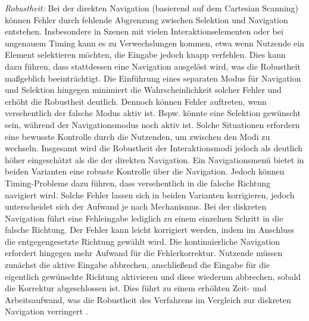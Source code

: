 \textit{Robustheit:}
Bei der direkten Navigation (basierend auf dem Cartesian Scanning) können Fehler durch fehlende Abgrenzung zwischen Selektion und Navigation entstehen. Insbesondere in Szenen mit vielen Interaktionselementen oder bei ungenauem Timing kann es zu Verwechslungen kommen, etwa wenn Nutzende ein Element selektieren möchten, die Eingabe jedoch knapp verfehlen. Dies kann dazu führen, dass stattdessen eine Navigation ausgelöst wird, was die Robustheit maßgeblich beeinträchtigt. Die Einführung eines separaten Modus für Navigation und Selektion hingegen minimiert die Wahrscheinlichkeit solcher Fehler und erhöht die Robustheit deutlich. Dennoch können Fehler auftreten, wenn versehentlich der falsche Modus aktiv ist. Bspw. könnte eine Selektion gewünscht sein, während der Navigationsmodus noch aktiv ist. Solche Situationen erfordern eine bewusste Kontrolle durch die Nutzenden, um zwischen den Modi zu wechseln. Insgesamt wird die Robustheit der Interaktionsmodi jedoch als deutlich höher eingeschätzt als die der direkten Navigation.
Ein Navigationsmenü bietet in beiden Varianten eine robuste Kontrolle über die Navigation. Jedoch können Timing-Probleme dazu führen, dass versehentlich in die falsche Richtung navigiert wird. Solche Fehler lassen sich in beiden Varianten korrigieren, jedoch unterscheidet sich der Aufwand je nach Mechanismus. Bei der diskreten Navigation führt eine Fehleingabe lediglich zu einem einzelnen Schritt in die falsche Richtung. Der Fehler kann leicht korrigiert werden, indem im Anschluss die entgegengesetzte Richtung gewählt wird. Die kontinuierliche Navigation erfordert hingegen mehr Aufwand für die Fehlerkorrektur. Nutzende müssen zunächst die aktive Eingabe abbrechen, anschließend die Eingabe für die eigentlich gewünschte Richtung aktivieren und diese wiederum abbrechen, sobald die Korrektur abgeschlossen ist. Dies führt zu einem erhöhten Zeit- und Arbeitsaufwand, was die Robustheit des Verfahrens im Vergleich zur diskreten Navigation verringert \citep{10.1145/2159365.2159386}. 

